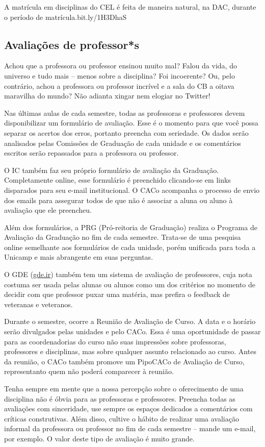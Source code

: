 A matrícula em disciplinas do CEL é feita de maneira natural, na DAC, durante o
período de matrícula.bit.ly/1H3DhaS

\subsection{Avaliações de professor*s}

Achou que a professora ou professor ensinou muito mal? Falou da vida, do
universo e tudo mais -- menos sobre a disciplina? Foi incoerente? Ou, pelo
contrário, achou a professora ou professor incrível e a sala do CB a oitava
maravilha do mundo? Não adianta xingar nem elogiar no Twitter!

Nas últimas aulas de cada semestre, todas as professoras e professores devem
disponibilizar um formulário de avaliação. Esse é o momento para que você possa
separar os acertos dos erros, portanto preencha com seriedade. Os dados serão
analisados pelas Comissões de Graduação de cada unidade e os comentários
escritos serão repassados para a professora ou professor.

O IC também faz seu próprio formulário de avaliação da Graduação. Completamente
online, esse formulário é preenchido clicando-se em links disparados para seu
e-mail institucional. O CACo acompanha o processo de envio dos emails para
assegurar todos de que não é associar a aluna ou aluno à avaliação que ele
preencheu.

Além dos formulários, a PRG (Pró-reitoria de Graduação) realiza o Programa de
Avaliação da Graduação no fim de cada semestre. Trata-se de uma pesquisa
online semelhante aos formulários de cada unidade, porém unificada para toda a
Unicamp e mais abrangente em suas perguntas.

O GDE (\url{gde.ir}) também tem um sistema de avaliação de professores, cuja
nota costuma ser usada pelas alunas ou alunos como um dos critérios no momento
de decidir com que professor puxar uma matéria, mas prefira o feedback de
veteranas e veteranos.

Durante o semestre, ocorre a Reunião de Avaliação de Curso. A data e o horário
serão divulgados pelas unidades e pelo CACo. Essa é uma oportunidade de passar
para as coordenadorias do curso não suas impressões sobre professoras,
professores e disciplinas, mas sobre qualquer assunto relacionado ao curso.
Antes da reunião, o CACo também promove um PipoCACo de Avaliação de Curso,
representanto quem não poderá comparecer à reunião.

Tenha sempre em mente que a nossa percepção sobre o oferecimento de uma
disciplina não é óbvia para as professoras e professores. Preencha todas as
avaliações com sinceridade, use sempre os espaços dedicados a comentários com
críticas construtivas. Além disso, cultive o hábito de realizar uma avaliação
informal da professora ou professor no fim de cada semestre -- mande um e-mail,
por exemplo. O valor deste tipo de avaliação é muito grande.
